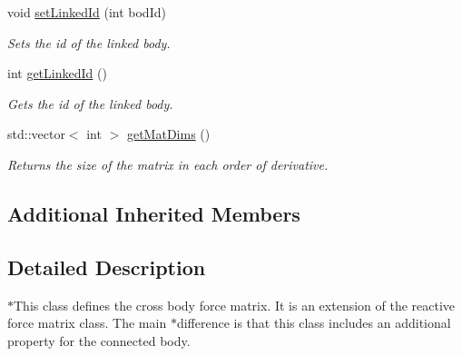 \begin{DoxyCompactItemize}
\item 
void \hyperlink{classosea_1_1ofreq_1_1mat_force_cross_a285c83c27df6413f90665480d2f3a4ed}{set\-Linked\-Id} (int bod\-Id)
\begin{DoxyCompactList}\small\item\em Sets the id of the linked body. \end{DoxyCompactList}\item 
int \hyperlink{classosea_1_1ofreq_1_1mat_force_cross_a613dfb7f1c2d351df3f0e3ab1efc5bfa}{get\-Linked\-Id} ()
\begin{DoxyCompactList}\small\item\em Gets the id of the linked body. \end{DoxyCompactList}\item 
std\-::vector$<$ int $>$ \hyperlink{classosea_1_1ofreq_1_1mat_force_cross_ae842c91c8c3de5c273b2931577e793b4}{get\-Mat\-Dims} ()
\begin{DoxyCompactList}\small\item\em Returns the size of the matrix in each order of derivative. \end{DoxyCompactList}\end{DoxyCompactItemize}
\subsection*{Additional Inherited Members}


\subsection{Detailed Description}
$\ast$\-This class defines the cross body force matrix. It is an extension of the reactive force matrix class. The main $\ast$difference is that this class includes an additional property for the connected body. 

